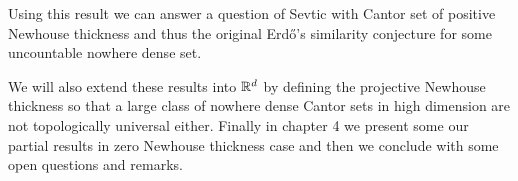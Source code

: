 Using this result we can answer a question of Sevtic with Cantor set of positive Newhouse thickness and thus the original Erd\H{o}'s similarity conjecture for some uncountable nowhere dense set. 

\medskip

We will also extend these results into $\mathbb{R}^d$ by defining the projective Newhouse thickness so that a large class of nowhere dense Cantor sets in high dimension are not topologically universal either.   Finally in chapter 4 we present some our partial  results in zero Newhouse thickness case and then we conclude with some open questions and remarks.  


